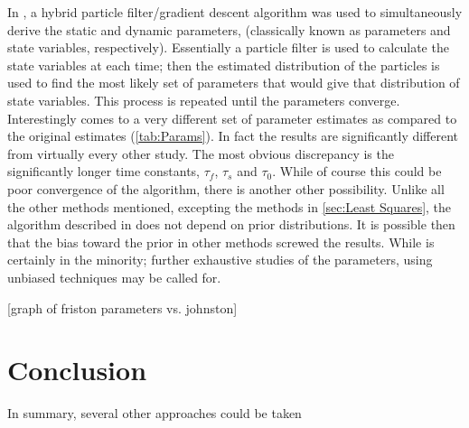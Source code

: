 In \cite{Johnston2008}, a hybrid particle filter/gradient
descent algorithm was used to simultaneously derive the static and dynamic 
parameters, (classically known as parameters and state variables, respectively).
Essentially a particle filter is used to calculate the state variables at each
time; then the estimated distribution of the particles is used to find
the most likely set of parameters that would give that distribution of state variables.
This process is repeated until the parameters converge. Interestingly
\cite{Johnston2008} comes to a very different set of parameter estimates as compared
to the original \cite{Friston2000} estimates (\autoref{tab:Params}). In fact the results 
are significantly different from virtually every other study. The most obvious discrepancy
is the significantly longer time constants, $\tau_f$, $\tau_s$ and $\tau_0$. 
While of course this could be poor convergence of the algorithm, there is another other possibility.
Unlike all the other methods mentioned, excepting the methods in \autoref{sec:Least Squares},
the algorithm described in \cite{Johnston2008} does not depend on prior distributions.
It is possible then that the bias toward the prior in other methods screwed the results. 
While \cite{Johnston2008} is certainly in the minority; further exhaustive studies 
of the parameters, using unbiased techniques may be called for. 

[graph of friston parameters vs. johnston]

\section{Conclusion}
In summary, several other approaches could be taken 

